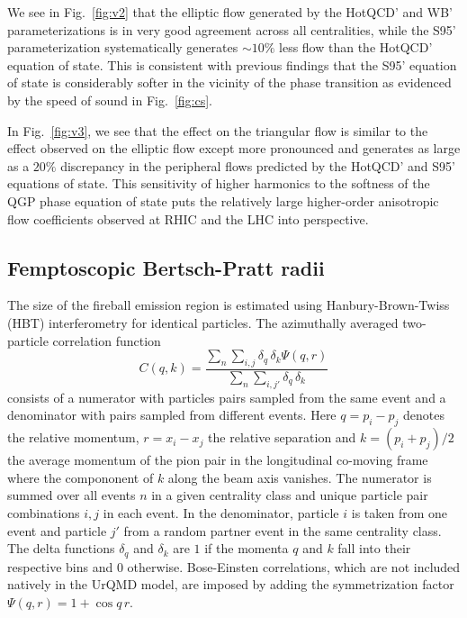 \documentclass[aps,prc,reprint,amsmath,nofootinbib,superscriptaddress]{revtex4-1}
\begin{document}
We see in Fig.~\ref{fig:v2} that the elliptic flow generated by the HotQCD' and WB' parameterizations is in very good agreement across all centralities, while the S95' parameterization systematically generates $\sim 10\%$ less 
flow than the HotQCD' equation of state. This is consistent with previous findings that the S95' equation of state is considerably softer in the vicinity of the phase transition as evidenced by the 
speed of sound in Fig.~\ref{fig:cs}. 

In Fig.~\ref{fig:v3}, we see that the effect on the triangular flow is similar to the effect observed on the elliptic flow except more pronounced and generates as large as a $20\%$ discrepancy in the peripheral flows
predicted by the HotQCD' and S95' equations of state. This sensitivity of higher harmonics to the softness of the QGP phase equation of state puts the relatively large higher-order anisotropic flow coefficients observed at
RHIC and the LHC into perspective. 

\subsection{Femptoscopic Bertsch-Pratt radii}
\label{hbt}

The size of the fireball emission region is estimated using Hanbury-Brown-Twiss (HBT) interferometry for identical particles. The azimuthally averaged two-particle correlation function 
\begin{equation}
 \label{hbt}
 C(q, k) = \frac{\sum\limits_n \sum\limits_{i, j} \delta_{q} \, \delta_{k}\Psi(q,r)}{\sum\limits_{n} \sum\limits_{i,j'} \delta_{q} \, \delta_{k}}
\end{equation}
consists of a numerator with particles pairs sampled from the same event and a denominator with pairs sampled from different events. Here $q = p_i - p_j$ denotes the relative momentum, $r=x_i-x_j$ the relative separation and $k = (p_i + p_j)/2$ the average momentum of the pion pair in the longitudinal co-moving 
frame where the compononent of $k$ along the beam axis vanishes. The numerator is summed over all events $n$ in a given centrality class and unique particle pair combinations $i,j$ in each event. In the denominator, particle $i$ is
taken from one event and particle $j'$ from a random partner event in the same centrality class. The delta functions $\delta_q$ and $\delta_k$ are $1$ if the momenta $q$ and $k$ fall into their respective bins and $0$ otherwise. Bose-Einsten 
correlations, which are not included natively in the UrQMD model, are imposed by adding the symmetrization factor $\Psi(q,r) = 1 + \cos q\,r$. 
\end{document}
